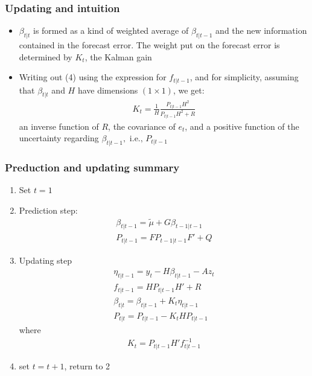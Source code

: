 \documentclass[10pt]{article}
\begin{document}
\subsubsection{Updating and intuition}
\begin{itemize}
    \item $\beta_{t|t} $ is formed as a kind of weighted average of $\beta_{t|t - 1} $ and the new information contained in the forecast error. The weight put on the forecast error is determined by $K_t $, the Kalman gain 
    \item Writing out (4) using the expression for $f_{t|t - 1} $, and for simplicity, assuming that $\beta_{t|t} $ and $H $ have dimensions $(1\times 1)$, we get: 
    \begin{gather*}
        K_t = \frac{1}{H}\frac{P_{t|t - 1}H^2}{P_{t|t - 1}H^2 + R}
    \end{gather*}
    an inverse function of $R $, the covariance of $e_t $, and a positive function of the uncertainty regarding $\beta_{t|t - 1},\text{ i.e., }P_{t|t - 1}$
\end{itemize}
\subsubsection{Preduction and updating summary}
\begin{enumerate}
    \item Set $t = 1 $
    \item Prediction step: 
    \begin{gather*}
        \beta_{t|t - 1} = \tilde{\mu} + G\beta_{t - 1|t - 1}\\
        P_{t|t - 1} = FP_{t -1 |t - 1}F' + Q 
    \end{gather*}
    \item Updating step 
    \begin{gather*}
        \eta_{t|t - 1} = y_t - H\beta_{t|t - 1}-Az_t \\
        f_{t|t - 1} = HP_{t |t - 1}H' + R\\
        \beta_{t|t} = \beta_{t|t - 1} + K_t\eta_{t|t - 1}\\
        P_{t|t} = P_{t|t - 1} - K_tHP_{t|t - 1}
    \end{gather*}
    where 
    \begin{gather*}
        K_t = P_{t|t - 1}H'f_{t|t-1}^{-1}
    \end{gather*}
    \item set $t = t + 1 $, return to 2
\end{enumerate}
\end{document}
